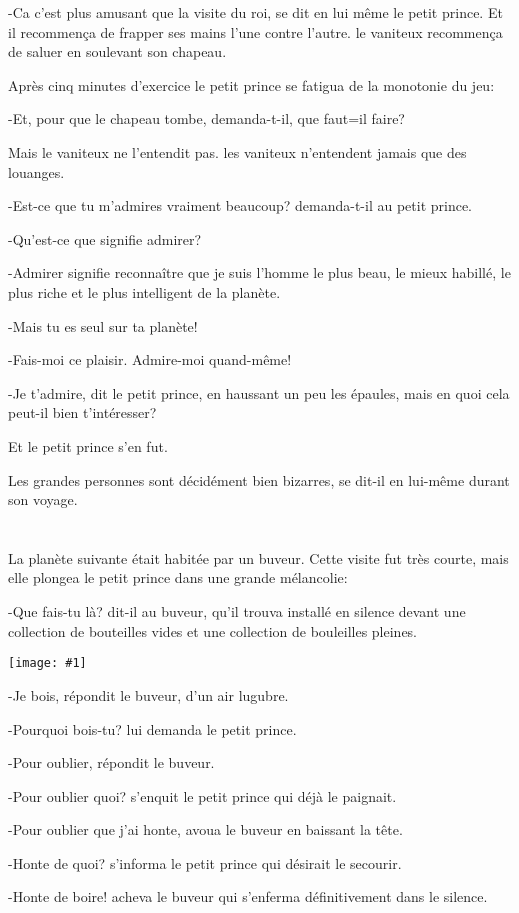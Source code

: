 \documentclass{report}
\newcommand{\parachapter}[2][]{\end{paracol}\chapter[#1]{#2}\begin{paracol}{2}}
\newcommand{\incpic}[1]{%
\end{paracol}
\begin{center}
    \texttt{[image: \#1]}
\end{center}
\begin{paracol}{2}}
\begin{document}
\begin{paracol}{2}
-Ca c'est plus amusant que la visite du roi, se dit en lui même le petit prince. Et il recommença de frapper ses mains l'une contre l'autre. le vaniteux recommença de saluer en soulevant son chapeau.

Après cinq minutes d'exercice le petit prince se fatigua de la monotonie du jeu:

-Et, pour que le chapeau tombe, demanda-t-il, que faut=il faire?

Mais le vaniteux ne l'entendit pas. les vaniteux n'entendent jamais que des louanges.

-Est-ce que tu m'admires vraiment beaucoup? demanda-t-il au petit prince.

-Qu'est-ce que signifie admirer?

-Admirer signifie reconnaître que je suis l'homme le plus beau, le mieux habillé, le plus riche et le plus intelligent de la planète.

-Mais tu es seul sur ta planète!

-Fais-moi ce plaisir. Admire-moi quand-même!

-Je t'admire, dit le petit prince, en haussant un peu les épaules, mais en quoi cela peut-il bien t'intéresser?

Et le petit prince s'en fut.

Les grandes personnes sont décidément bien bizarres, se dit-il en lui-même durant son voyage.

\parachapter{} %
La planète suivante était habitée par un buveur. Cette visite fut très courte, mais elle plongea le petit prince dans une grande mélancolie:

-Que fais-tu là? dit-il au buveur, qu'il trouva installé en silence devant une collection de bouteilles vides et une collection de bouleilles pleines.

\incpic{pic/image27.jpeg}

-Je bois, répondit le buveur, d'un air lugubre.

-Pourquoi bois-tu? lui demanda le petit prince.

-Pour oublier, répondit le buveur.

-Pour oublier quoi? s'enquit le petit prince qui déjà le paignait.

-Pour oublier que j'ai honte, avoua le buveur en baissant la tête.

-Honte de quoi? s'informa le petit prince qui désirait le secourir.

-Honte de boire! acheva le buveur qui s'enferma définitivement dans le silence.


\end{paracol}
\end{document}
